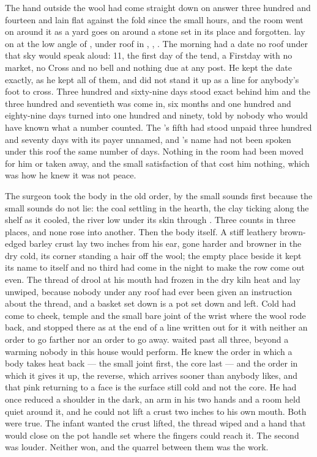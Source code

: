 
The hand outside the wool had come straight down on answer three hundred and fourteen and lain flat against the fold since the small hours, and the room went on around it as a yard goes on around a stone set in its place and forgotten.  lay on  at the low angle of , under  roof in , , . The morning had a date no roof under that sky would speak aloud:  11, the first day of the tend, a Firstday with no market, no Cross and no bell and nothing due at any post. He kept the date exactly, as he kept all of them, and did not stand it up as a line for anybody's foot to cross. Three hundred and sixty-nine days stood exact behind him and the three hundred and seventieth was come in, six months and one hundred and eighty-nine days turned into one hundred and ninety, told by nobody who would have known what a number counted. The 's fifth had stood unpaid three hundred and seventy days with its payer unnamed, and 's name had not been spoken under this roof the same number of days. Nothing in the room had been moved for him or taken away, and the small satisfaction of that cost him nothing, which was how he knew it was not peace.

The surgeon took the body in the old order, by the small sounds first because the small sounds do not lie: the coal settling in the hearth, the clay ticking along the shelf as it cooled, the river low under its skin through . Three counts in three places, and none rose into another. Then the body itself. A stiff leathery brown-edged barley crust lay two inches from his ear, gone harder and browner in the dry cold, its corner standing a hair off the wool; the empty place beside it kept its name to itself and no third had come in the night to make the row come out even. The thread of drool at his mouth had frozen in the dry kiln heat and lay unwiped, because nobody under any roof had ever been given an instruction about the thread, and a basket set down is a pot set down and left. Cold had come to cheek, temple and the small bare joint of the wrist where the wool rode back, and stopped there as at the end of a line written out for it with neither an order to go farther nor an order to go away.  waited past all three, beyond a warming nobody in this house would perform. He knew the order in which a body takes heat back --- the small joint first, the core last --- and the order in which it gives it up, the reverse, which arrives sooner than anybody likes, and that pink returning to a face is the surface still cold and not the core. He had once reduced a shoulder in the dark, an arm in his two hands and a room held quiet around it, and he could not lift a crust two inches to his own mouth. Both were true. The infant wanted the crust lifted, the thread wiped and a hand that would close on the pot handle set where the fingers could reach it. The second was louder. Neither won, and the quarrel between them was the work.

